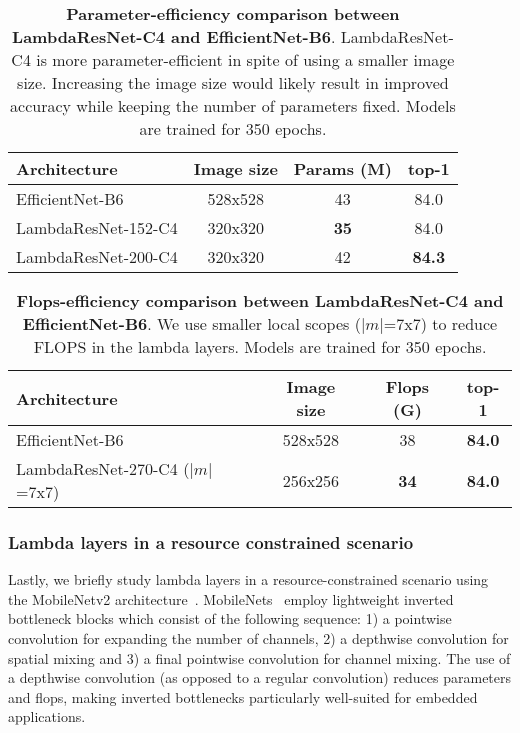 \documentclass{article} \usepackage{iclr2021_conference,times}
\begin{document}
\begin{table}[h!]
    \begin{center}
    \small
    \begin{tabular}{lccc}
    \toprule
    Architecture & Image size & Params (M) & top-1 \\
    \midrule
    EfficientNet-B6 & 528x528 & 43 & 84.0 \\
    LambdaResNet-152-C4 & 320x320 & \textbf{35} & 84.0 \\
    LambdaResNet-200-C4 & 320x320 & 42 & \textbf{84.3} \\
    \bottomrule
    \end{tabular}
    \caption{
    \textbf{Parameter-efficiency comparison between LambdaResNet-C4 and EfficientNet-B6}.
    LambdaResNet-C4 is more parameter-efficient in spite of using a smaller image size.
    Increasing the image size would likely result in improved accuracy while keeping the number of parameters fixed. Models are trained for 350 epochs.}
    \label{tab:parameter_efficient}
    \end{center}
\end{table}

\begin{table}[h!]
    \begin{center}
    \small
    \begin{tabular}{lccc}
    \toprule
    Architecture & Image size & Flops (G) & top-1 \\
    \midrule
    EfficientNet-B6 & 528x528 & 38 & \textbf{84.0} \\
    LambdaResNet-270-C4 ($|m|$=7x7) & 256x256 & \textbf{34} & \textbf{84.0} \\
    \bottomrule
    \end{tabular}
    \caption{
    \textbf{Flops-efficiency comparison between LambdaResNet-C4 and EfficientNet-B6}.
    We use smaller local scopes ($|m|$=7x7) to reduce FLOPS in the lambda layers. Models are trained for 350 epochs.}
    \label{tab:flops_efficient}
    \end{center}
\end{table}

\subsubsection{Lambda layers in a resource constrained scenario \label{sec:mobilenets}}
Lastly, we briefly study lambda layers in a resource-constrained scenario using the MobileNetv2 architecture~\citep{sandler2018mobilenetv2}.
MobileNets~\citep{howard2017mobilenets,sandler2018mobilenetv2,howard2019searching} employ lightweight inverted bottleneck blocks which consist of the following sequence: 1) a pointwise convolution for expanding the number of channels, 2) a depthwise convolution for spatial mixing and 3) a final pointwise convolution for channel mixing.
The use of a depthwise convolution (as opposed to a regular convolution) reduces parameters and flops, making inverted bottlenecks particularly well-suited for embedded applications.
\end{document}
